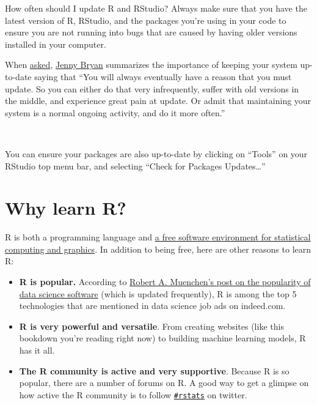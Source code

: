 \documentclass[
]{book}
\begin{document}
How often should I update R and RStudio? Always make sure that you have the latest version of R, RStudio, and the packages you're using in your code to ensure you are not running into bugs that are caused by having older versions installed in your computer.

When \href{https://community.rstudio.com/t/should-i-update-all-my-r-packages-frequently-yes-no-why/5856/4}{asked}, \href{https://community.rstudio.com/u/jennybryan}{Jenny Bryan} summarizes the importance of keeping your system up-to-date saying that ``You will always eventually have a reason that you must update. So you can either do that very infrequently, suffer with old versions in the middle, and experience great pain at update. Or admit that maintaining your system is a normal ongoing activity, and do it more often.''

~

You can ensure your packages are also up-to-date by clicking on ``Tools'' on your RStudio top menu bar, and selecting ``Check for Packages Updates\ldots{}''

\hypertarget{why-learn-r}{%
\section{Why learn R?}\label{why-learn-r}}

R is both a programming language and \href{https://www.r-project.org/}{a free software environment for statistical computing and graphics}. In addition to being free, here are other reasons to learn R:

\begin{itemize}
\item
  \textbf{R is popular.} According to \href{http://r4stats.com/articles/popularity/}{Robert A. Muenchen's post on the popularity of data science software} (which is updated frequently), R is among the top 5 technologies that are mentioned in data science job ads on indeed.com.
\item
  \textbf{R is very powerful and versatile}. From creating websites (like this bookdown you're reading right now) to building machine learning models, R has it all.
\item
  \textbf{The R community is active and very supportive}. Because R is so popular, there are a number of forums on R. A good way to get a glimpse on how active the R community is to follow \href{https://twitter.com/search?q=\%23rstats}{\texttt{\#rstats}} on twitter.
\end{itemize}
\end{document}
